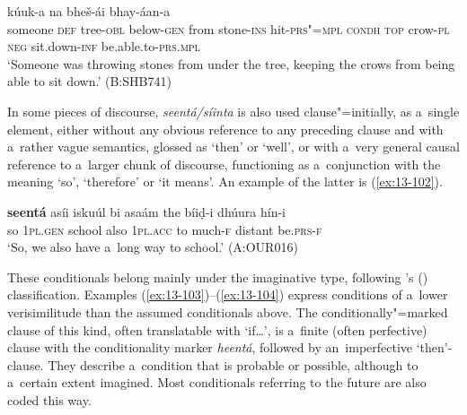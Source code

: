 \begin{exe}
\ex
\label{ex:13-101}
 kúuk-a
na bheš-ái  bhay-áan-a \\
someone \textsc{def} tree-\textsc{obl} below-\textsc{gen} from stone-\textsc{ins}  hit-\textsc{prs"=mpl} \textsc{condh} \textsc{top} crow-\textsc{pl} \textsc{neg} sit.down-\textsc{inf} be.able.to-\textsc{prs.mpl} \\
\glt `Someone was throwing stones from under the tree, keeping the crows from being able to sit down.' (B:SHB741) 
\end{exe}

In some pieces of discourse, \textit{seentá/síinta} is also used clause"=initially, as a~single element, either without any obvious reference to any preceding clause and with a~rather vague semantics, glossed as `then' or `well', or with a~very general causal reference to a~larger chunk of discourse, functioning as a~conjunction with the meaning `so', `therefore' or `it means'. An example of the latter is (\ref{ex:13-102}).

\begin{exe}
\ex
\label{ex:13-102}
\gll \textbf{seentá} asíi iskuúl bi asaám the bíiḍ-i dhúura  hín-i \\
so \textsc{1pl.gen} school also \textsc{1pl.acc} to much-\textsc{f} distant be.\textsc{prs-f} \\
\glt `So, we also have a~long way to school.' (A:OUR016) 
\end{exe}

 These conditionals belong mainly under the imaginative type, following \citeauthor{thompsonetal2007}'s (\citeyear[259--260]{thompsonetal2007}) classification. Examples (\ref{ex:13-103})--(\ref{ex:13-104}) express conditions of a~lower verisimilitude than the assumed conditionals above. The conditionally"=marked clause of this kind, often translatable with `if{\ldots}', is a~finite (often perfective) clause with the conditionality marker \textit{heentá}, followed by an~imperfective `then'-clause. They describe a~condition that is probable or possible, although to a~certain extent imagined. Most conditionals referring to the future are also coded this way.

